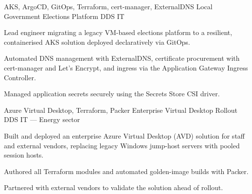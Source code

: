 


\begin{cventries}


\cventry
{AKS, ArgoCD, GitOps, Terraform, cert-manager, ExternalDNS} %
{Local Government Elections Platform} %
{DDS IT} %
{} %
{ %
\begin{cvitems}
\item {Lead engineer migrating a legacy VM-based elections platform to a resilient, containerised AKS solution deployed declaratively via GitOps.}
\item {Automated DNS management with ExternalDNS, certificate procurement with cert-manager and Let's Encrypt, and ingress via the Application Gateway Ingress Controller.}
\item {Managed application secrets securely using the Secrets Store CSI driver.}
\end{cvitems}
}


\cventry
{Azure Virtual Desktop, Terraform, Packer} %
{Enterprise Virtual Desktop Rollout} %
{DDS IT --- Energy sector} %
{} %
{ %
\begin{cvitems}
\item {Built and deployed an enterprise Azure Virtual Desktop (AVD) solution for staff and external vendors, replacing legacy Windows jump-host servers with pooled session hosts.}
\item {Authored all Terraform modules and automated golden-image builds with Packer.}
\item {Partnered with external vendors to validate the solution ahead of rollout.}
\end{cvitems}
}


\end{cventries}
